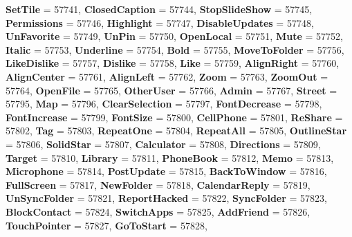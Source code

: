 \begin{DoxyCompactItemize}
{\bfseries Set\+Tile} = 57741, 
{\bfseries Closed\+Caption} = 57744, 
{\bfseries Stop\+Slide\+Show} = 57745, 
{\bfseries Permissions} = 57746, 
\newline
{\bfseries Highlight} = 57747, 
{\bfseries Disable\+Updates} = 57748, 
{\bfseries Un\+Favorite} = 57749, 
{\bfseries Un\+Pin} = 57750, 
\newline
{\bfseries Open\+Local} = 57751, 
{\bfseries Mute} = 57752, 
{\bfseries Italic} = 57753, 
{\bfseries Underline} = 57754, 
\newline
{\bfseries Bold} = 57755, 
{\bfseries Move\+To\+Folder} = 57756, 
{\bfseries Like\+Dislike} = 57757, 
{\bfseries Dislike} = 57758, 
\newline
{\bfseries Like} = 57759, 
{\bfseries Align\+Right} = 57760, 
{\bfseries Align\+Center} = 57761, 
{\bfseries Align\+Left} = 57762, 
\newline
{\bfseries Zoom} = 57763, 
{\bfseries Zoom\+Out} = 57764, 
{\bfseries Open\+File} = 57765, 
{\bfseries Other\+User} = 57766, 
\newline
{\bfseries Admin} = 57767, 
{\bfseries Street} = 57795, 
{\bfseries Map} = 57796, 
{\bfseries Clear\+Selection} = 57797, 
\newline
{\bfseries Font\+Decrease} = 57798, 
{\bfseries Font\+Increase} = 57799, 
{\bfseries Font\+Size} = 57800, 
{\bfseries Cell\+Phone} = 57801, 
\newline
{\bfseries Re\+Share} = 57802, 
{\bfseries Tag} = 57803, 
{\bfseries Repeat\+One} = 57804, 
{\bfseries Repeat\+All} = 57805, 
\newline
{\bfseries Outline\+Star} = 57806, 
{\bfseries Solid\+Star} = 57807, 
{\bfseries Calculator} = 57808, 
{\bfseries Directions} = 57809, 
\newline
{\bfseries Target} = 57810, 
{\bfseries Library} = 57811, 
{\bfseries Phone\+Book} = 57812, 
{\bfseries Memo} = 57813, 
\newline
{\bfseries Microphone} = 57814, 
{\bfseries Post\+Update} = 57815, 
{\bfseries Back\+To\+Window} = 57816, 
{\bfseries Full\+Screen} = 57817, 
\newline
{\bfseries New\+Folder} = 57818, 
{\bfseries Calendar\+Reply} = 57819, 
{\bfseries Un\+Sync\+Folder} = 57821, 
{\bfseries Report\+Hacked} = 57822, 
\newline
{\bfseries Sync\+Folder} = 57823, 
{\bfseries Block\+Contact} = 57824, 
{\bfseries Switch\+Apps} = 57825, 
{\bfseries Add\+Friend} = 57826, 
\newline
{\bfseries Touch\+Pointer} = 57827, 
{\bfseries Go\+To\+Start} = 57828, 

\end{DoxyCompactItemize}
